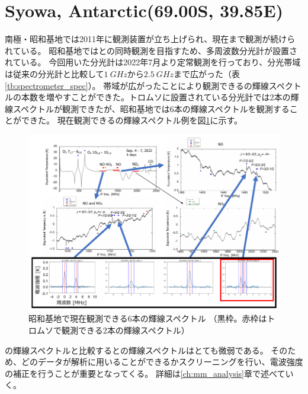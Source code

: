 \section{Syowa, Antarctic(69.00\textdegree S, 39.85\textdegree E)}
\label{sec:mm_syowa}
南極・昭和基地では2011年に観測装置が立ち上げられ、現在まで観測が続けられている。
昭和基地ではとの同時観測を目指すため、多周波数分光計が設置されている。
今回用いた分光計は2022年7月より定常観測を行っており、分光帯域は従来の分光計と比較して$1\ GHz$から$2.5\ GHz$まで広がった（表\ref{tb:spectrometer_spec}）。
帯域が広がったことにより観測できるの輝線スペクトルの本数を増やすことができた。トロムソに設置されている分光計では2本の輝線スペクトルが観測できたが、昭和基地では6本の輝線スペクトルを観測することができた。
現在観測できるの輝線スペクトル例を図\ref{fig:NO_spectr}に示す。
\begin{figure}[htbp]
    \centering
    \includegraphics[width=\linewidth]{master_thesis_contents/master_thesis_fig/NO_spectr.pdf}
    \caption{\protect 昭和基地で現在観測できる6本の輝線スペクトル \linebreak
    （黒枠。赤枠はトロムソで観測できる2本の輝線スペクトル）}
    \label{fig:NO_spectr}
\end{figure}
の輝線スペクトルと比較するとの輝線スペクトルはとても微弱である。
そのため、どのデータが解析に用いることができるかスクリーニングを行い、電波強度の補正を行うことが重要となってくる。
詳細は\ref{ch:mm_analysis}章で述べていく。
